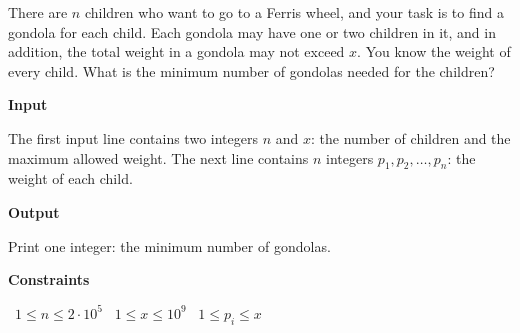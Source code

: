 There are $n$ children who want to go to a Ferris wheel, and your task is to find a gondola for each child.
Each gondola may have one or two children in it, and in addition, the total weight in a gondola may not exceed $x$. You know the weight of every child.
What is the minimum number of gondolas needed for the children?

\vspace{0.3cm}\noindent\textbf{Input}

The first input line contains two integers $n$ and $x$: the number of children and the maximum allowed weight.
The next line contains $n$ integers $p_1,p_2,\ldots,p_n$: the weight of each child.

\vspace{0.3cm}\noindent\textbf{Output}

Print one integer: the minimum number of gondolas.

\vspace{0.3cm}\noindent\textbf{Constraints}

\textbullet\ $1 \le n \le 2 \cdot 10^5$
\textbullet\ $1 \le x \le 10^9$
\textbullet\ $1 \le p_i \le x$